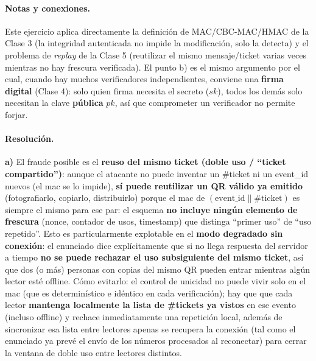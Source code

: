 \paragraph{Notas y conexiones.}
Este ejercicio aplica directamente la definición de MAC/CBC-MAC/HMAC de la Clase 3 (la
integridad autenticada no impide la modificación, solo la detecta) y el problema de
\emph{replay} de la Clase 5 (reutilizar el mismo mensaje/ticket varias veces mientras no hay
frescura verificada). El punto b) es el mismo argumento por el cual, cuando hay muchos
verificadores independientes, conviene una \textbf{firma digital} (Clase 4): solo quien firma
necesita el secreto ($sk$), todos los demás solo necesitan la clave \textbf{pública} $pk$, así
que comprometer un verificador no permite forjar.

\paragraph{Resolución.}

\textbf{a)} El fraude posible es el \textbf{reuso del mismo ticket (doble uso / ``ticket
compartido'')}: aunque el atacante no puede inventar un \#ticket ni un event\_id nuevos (el
mac se lo impide), \textbf{sí puede reutilizar un QR válido ya emitido} (fotografiarlo,
copiarlo, distribuirlo) porque el mac de $(\text{event\_id}\|\#\text{ticket})$ es siempre el
mismo para ese par: el esquema \textbf{no incluye ningún elemento de frescura} (nonce,
contador de usos, timestamp) que distinga ``primer uso'' de ``uso repetido''. Esto es
particularmente explotable en el \textbf{modo degradado sin conexión}: el enunciado dice
explícitamente que si no llega respuesta del servidor a tiempo \textbf{no se puede rechazar
el uso subsiguiente del mismo ticket}, así que dos (o más) personas con copias del mismo QR
pueden entrar mientras algún lector esté offline. Cómo evitarlo: el control de unicidad no
puede vivir solo en el mac (que es determinístico e idéntico en cada verificación); hay que
que cada lector \textbf{mantenga localmente la lista de \#tickets ya vistos} en ese evento
(incluso offline) y rechace inmediatamente una repetición local, además de sincronizar esa
lista entre lectores apenas se recupera la conexión (tal como el enunciado ya prevé el envío
de los números procesados al reconectar) para cerrar la ventana de doble uso entre lectores
distintos.

